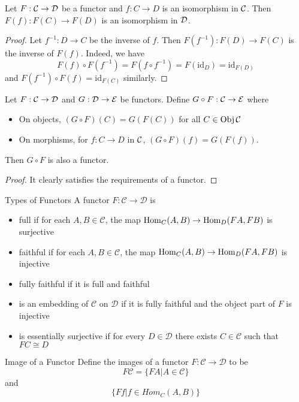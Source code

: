 \documentclass[a4paper]{article}
\begin{document}
\begin{lmm}{}{} Let $F:\mathcal{C}\to\mathcal{D}$ be a functor and $f:C\to D$ is an isomorphism in $\mathcal{C}$. Then $F(f):F(C)\to F(D)$ is an isomorphism in $\mathcal{D}$. \tcbline
\begin{proof}
Let $f^{-1}:D\to C$ be the inverse of $f$. Then $F(f^{-1}):F(D)\to F(C)$ is the inverse of $F(f)$. Indeed, we have $$F(f)\circ F(f^{-1})=F(f\circ f^{-1})=F(\text{id}_D)=\text{id}_{F(D)}$$ and $F(f^{-1})\circ F(f)=\text{id}_{F(C)}$ similarly. 
\end{proof}
\end{lmm}

\begin{prp}{}{} Let $F:\mathcal{C}\to\mathcal{D}$ and $G:\mathcal{D}\to\mathcal{E}$ be functors. Define $G\circ F:\mathcal{C}\to\mathcal{E}$ where
\begin{itemize}
\item On objects, $(G\circ F)(C)=G(F(C))$ for all $C\in\operatorname{Obj}\mathcal{C}$
\item On morphisms, for $f:C\to D$ in $\mathcal{C}$, $(G\circ F)(f)=G(F(f))$. 
\end{itemize} 
Then $G\circ F$ is also a functor. \tcbline
\begin{proof}
It clearly satisfies the requirements of a functor. 
\end{proof}
\end{prp}

\begin{defn}{Types of Functors}{} A functor $F:\mathcal{C}\to\mathcal{D}$ is 
\begin{itemize}
\item full if for each $A,B\in\mathcal{C}$, the map $\operatorname{Hom}_C(A,B)\to\operatorname{Hom}_D(FA,FB)$ is surjective
\item faithful if for each $A,B\in\mathcal{C}$, the map $\operatorname{Hom}_C(A,B)\to\operatorname{Hom}_D(FA,FB)$ is injective
\item fully faithful if it is full and faithful
\item is an embedding of $\mathcal{C}$ on $\mathcal{D}$ if it is fully faithful and the object part of $F$ is injective
\item is essentially surjective if for every $D\in\mathcal{D}$ there exists $C\in\mathcal{C}$ such that $FC\cong D$
\end{itemize}
\end{defn}

\begin{defn}{Image of a Functor}{} Define the images of a functor $F:\mathcal{C}\to\mathcal{D}$ to be $$F\mathcal{C}=\{FA|A\in\mathcal{C}\}$$ and $$\{Ff|f\in Hom_C(A,B)\}$$
\end{defn}
\end{document}
